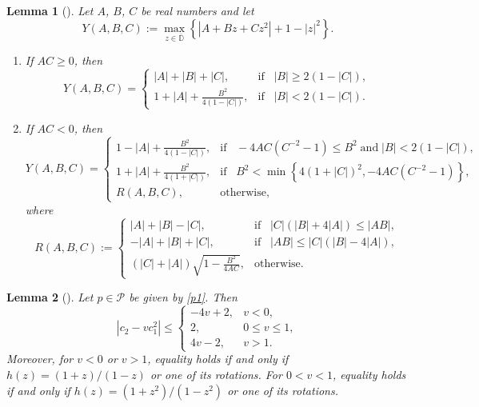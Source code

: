 \documentclass[11pt]{article}
\newtheorem{lem}{Lemma}[section]
\newcommand{\ol}{\overline}
\numberwithin{equation}{section}
\begin{document}
\begin{lem}[\cite{CKS1}]\label{L2}
Let $A$, $B$, $C$ be real numbers and let
\[Y(A, B, C):= \max\limits_{z\in \ol{\mathbb{D}}}\left\lbrace |A+Bz+Cz^2|+1-|z|^2\right\rbrace.\]
\begin{enumerate} 
\item[(i)] If $AC\geq 0$, then
\[Y(A, B, C) =
\begin{cases}
|A|+|B|+|C|, & \text{if}\;\;\; |B|\geq 2(1-|C|), \\
1+|A|+\frac{B^2}{4(1-|C|)}, &\text{if}\;\;\; |B|<2(1-|C|).
\end{cases}
\]
\item[(ii)] If $AC<0$, then 
\[Y(A,B,C)=
\begin{cases}
1-|A|+\frac{B^2}{4(1-|C|)}, &\text{if}\;\;\; -4AC(C^{-2}-1) \leq B^2\; \text{and}\; |B|<2(1-|C|), \\
1+|A|+\frac{B^2}{4(1+|C|)}, &\text{if}\;\;\; B^2<\min\left\{4(1+|C|)^2, -4AC(C^{-2}-1) \right\}, \\
R(A,B,C), &\text{otherwise},
\end{cases}
\]
where
\[R(A,B,C):=
\begin{cases}
|A|+|B|-|C|, & \text{if}\;\;\; |C|(|B|+4|A|) \leq |AB|, \\
-|A|+|B|+|C|, & \text{if}\;\;\; |AB|\leq |C|(|B|-4|A|), \\
(|C|+|A| )\sqrt{1-\frac{B^2}{4AC}}, &\text{otherwise}.
\end{cases}
\]
\end{enumerate} 
\end{lem}

\begin{lem}[\cite{MM}]\label{L3}
Let $p \in \mathcal{P}$ be given by \eqref{p1}. Then
\[
\left| c_2 - v c_1^2 \right| \le 
\begin{cases}
-4v + 2, & v < 0, \\
2, & 0 \leq v \leq 1, \\
4v - 2, & v > 1.
\end{cases}
\]
Moreover, for $v < 0$ or $v > 1$, equality holds if and only if $h(z) = (1+z)/(1-z)$ or one of its rotations. For $0 < v < 1$, equality holds if and only if $h(z) = (1+z^2)/(1-z^2)$ or one of its rotations.
\end{lem}
\end{document}

